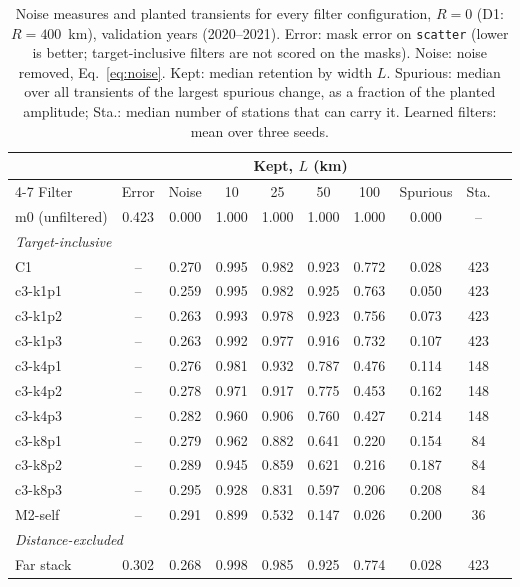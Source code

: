 \documentclass[preprint,12pt,authoryear]{elsarticle}
\begin{document}
\begin{table}[tbp]
  \centering
  \scriptsize\renewcommand{\arraystretch}{0.95}
  \caption{Noise measures and planted transients for every filter configuration, $R = 0$ (D1: $R = 400$~km), validation years (2020--2021). Error: mask error on \texttt{scatter} (lower is better; target-inclusive filters are not scored on the masks). Noise: noise removed, Eq.~\eqref{eq:noise}. Kept: median retention by width $L$. Spurious: median over all transients of the largest spurious change, as a fraction of the planted amplitude; Sta.: median number of stations that can carry it. Learned filters: mean over three seeds.}
  \label{tab:results}
  \setlength{\tabcolsep}{4pt}
  \begin{tabular}{lccccccccc}
    \toprule
    & & & \multicolumn{4}{c}{Kept, $L$ (km)} & & \\
    \cmidrule(lr){4-7}
    Filter & Error & Noise & 10 & 25 & 50 & 100 & Spurious & Sta. \\
    \midrule
    m0 (unfiltered) & 0.423 & 0.000 & 1.000 & 1.000 & 1.000 & 1.000 & 0.000 & -- \\
    \multicolumn{9}{l}{\textit{Target-inclusive}} \\
    C1 & -- & 0.270 & 0.995 & 0.982 & 0.923 & 0.772 & 0.028 & 423 \\
    c3-k1p1 & -- & 0.259 & 0.995 & 0.982 & 0.925 & 0.763 & 0.050 & 423 \\
    c3-k1p2 & -- & 0.263 & 0.993 & 0.978 & 0.923 & 0.756 & 0.073 & 423 \\
    c3-k1p3 & -- & 0.263 & 0.992 & 0.977 & 0.916 & 0.732 & 0.107 & 423 \\
    c3-k4p1 & -- & 0.276 & 0.981 & 0.932 & 0.787 & 0.476 & 0.114 & 148 \\
    c3-k4p2 & -- & 0.278 & 0.971 & 0.917 & 0.775 & 0.453 & 0.162 & 148 \\
    c3-k4p3 & -- & 0.282 & 0.960 & 0.906 & 0.760 & 0.427 & 0.214 & 148 \\
    c3-k8p1 & -- & 0.279 & 0.962 & 0.882 & 0.641 & 0.220 & 0.154 & 84 \\
    c3-k8p2 & -- & 0.289 & 0.945 & 0.859 & 0.621 & 0.216 & 0.187 & 84 \\
    c3-k8p3 & -- & 0.295 & 0.928 & 0.831 & 0.597 & 0.206 & 0.208 & 84 \\
    M2-self & -- & 0.291 & 0.899 & 0.532 & 0.147 & 0.026 & 0.200 & 36 \\
    \multicolumn{9}{l}{\textit{Distance-excluded}} \\
    Far stack & 0.302 & 0.268 & 0.998 & 0.985 & 0.925 & 0.774 & 0.028 & 423 \\

\end{tabular}
\end{table}
\end{document}
